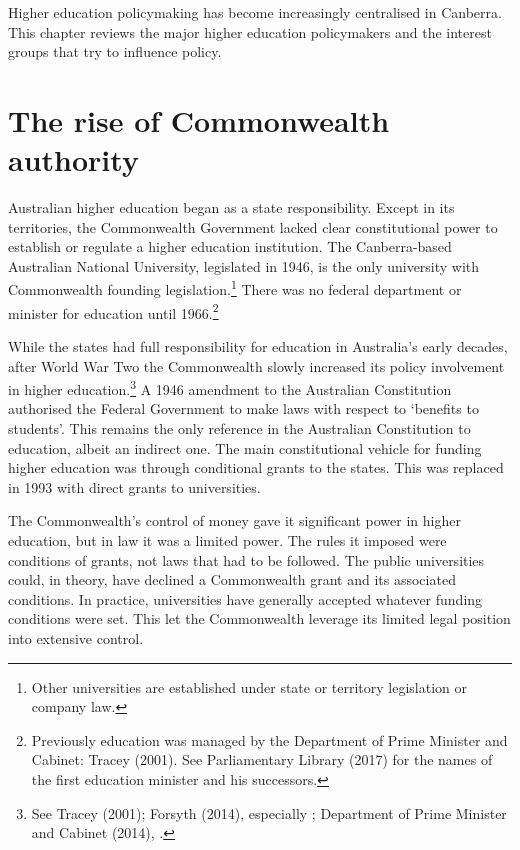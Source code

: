 \documentclass{grattan}
\begin{document}
Higher education policymaking has become increasingly centralised in Canberra. This chapter reviews the major higher education policymakers and the interest groups that try to influence policy.

%
\section{The rise of Commonwealth authority}\label{sec:the-rise-of-commonwealth-authority}

Australian higher education began as a state responsibility. Except in its territories, the Commonwealth Government lacked clear constitutional power to establish or regulate a higher education institution. The Canberra-based Australian National University, legislated in 1946, is the only university with Commonwealth founding legislation.\footnote{Other universities are established under state or territory legislation or company law.} There was no federal department or minister for education until 1966.\footnote{Previously education was managed by the Department of Prime Minister and Cabinet: Tracey (2001). See Parliamentary Library (2017) for the names of the first education minister and his successors.}

While the states had full responsibility for education in Australia's early decades, after World War Two the Commonwealth slowly increased its policy involvement in higher education.\footnote{See Tracey (2001); Forsyth (2014), especially ; Department of Prime Minister and Cabinet (2014), .} A 1946 amendment to the Australian Constitution authorised the Federal Government to make laws with respect to `benefits to students'. This remains the only reference in the Australian Constitution to education, albeit an indirect one. The main constitutional vehicle for funding higher education was through conditional grants to the states. This was replaced in 1993 with direct grants to universities.

The Commonwealth's control of money gave it significant power in higher education, but in law it was a limited power. The rules it imposed were conditions of grants, not laws that had to be followed. The public universities could, in theory, have declined a Commonwealth grant and its associated conditions. In practice, universities have generally accepted whatever funding conditions were set. This let the Commonwealth leverage its limited legal position into extensive control.
\end{document}
